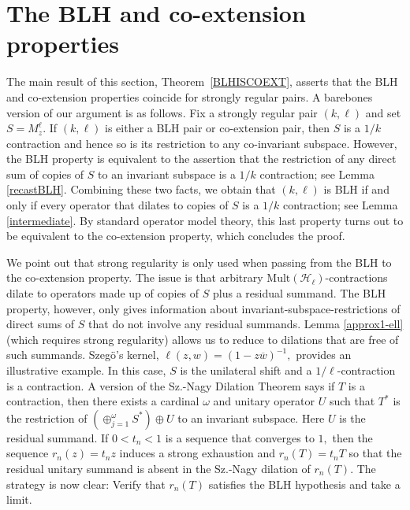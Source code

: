\documentclass[a4paper,reqno,index]{amsart}
\numberwithin{equation}{section}
\newcommand{\ol}[1]{\overline{#1}}
\theoremstyle{definition}
\begin{document}
\section{The BLH and co-extension properties}\label{BLHandco-extSec}

The main result of this section,  Theorem~\ref{BLHISCOEXT}, asserts that the BLH and co-extension properties coincide for strongly regular pairs.  A barebones version of our argument is as follows. Fix a strongly regular pair $(k, \ell)$ and set $S=M^{\ell}_z$. 
If $(k,\ell)$ is either a BLH pair or co-extension pair, then $S$ is a $1/k$ contraction 
 and hence so is its restriction to any co-invariant subspace. However, the BLH property is equivalent to the assertion  that the restriction of any direct sum of copies of $S$ to an invariant subspace is a $1/k$ contraction; see Lemma \ref{recastBLH}. Combining these two facts, we obtain that $(k, \ell)$ is BLH if and only if every operator that dilates to  copies of  $S$ is a $1/k$ contraction; see Lemma \ref{intermediate}. By standard operator model theory, this last property turns out to be equivalent to the co-extension property, which concludes the proof. \par We point out that strong regularity is only used when passing from the BLH to the co-extension property. The issue is that arbitrary $\text{Mult}(\mathcal{H}_{\ell})$-contractions dilate to operators made up of copies of $S$ plus a residual   summand. 
The BLH property, however, only gives information about invariant-subspace-restrictions of direct sums of $S$ that do not involve any residual summands. Lemma \ref{approx1-ell} (which requires strong regularity)
 allows us to reduce to dilations that are free of such summands.  Szeg\"o's kernel,
 $\ell(z,w)= (1-z\ol{w})^{-1},$ provides an illustrative example. 
  In this case, $S$ is the unilateral shift and a $1/\ell$-contraction
 is a contraction. A version 
 of the Sz.-Nagy Dilation Theorem says if $T$ is a contraction, then there
 exists a cardinal $\omega$ and unitary operator $U$ such that $T^*$ is the restriction of 
 $(\oplus_{j=1}^\omega S^*)\oplus U$ to an invariant subspace.  Here $U$ is the residual summand. 
 If $0<t_n<1$ is a sequence that converges to $1,$ then  the sequence
 $r_n(z)=t_n z$ induces a strong exhaustion and $r_n(T)=t_n T$  so that the residual unitary summand is absent
 in the  Sz.-Nagy dilation of $r_n(T).$  The strategy is now clear: Verify that $r_n(T)$ satisfies the BLH hypothesis and
 take a limit. 
 
\end{document}
